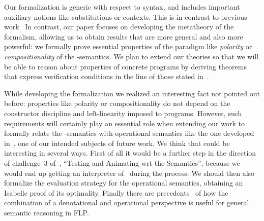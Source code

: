 \documentclass{llncs}
\begin{document}
Our formalization is generic with respect to syntax,
and includes important auxiliary notions like substitutions or
contexts. This is in contrast to previous
work~\cite{ClevaLL04,ClevaPita06}
In contrast, our paper focuses on developing the metatheory of the
formalism, allowing us to obtain results that are more general and
also more powerful: we formally prove essential properties of the
paradigm like \emph{polarity} or \emph{compositionality} of the
\crwl-semantics.
We plan to extend our theories so that we will be able to reason about
properties of concrete programs by deriving theorems that express
verification conditions in the line of those stated
in~\cite{ClevaLL04,ClevaPita06}.




While developing the formalization we realized an interesting fact not
pointed out before: properties like polarity or compositionality do
not depend on the constructor discipline and left-linearity imposed to
programs. However, such requirements will certainly play an essential
role when extending our work to formally relate the \crwl-semantics
with operational semantics like the one developed in~\cite{ppdp2007},
one of our intended subjects of future work. We think that could be
interesting in several ways. First of all it would be a further step
in the direction of challenge~3
of~\cite{DBLP:conf/tphol/AydemirBFFPSVWWZ05}, ``Testing and Animating
wrt the Semantics'', because we would end up getting an interpreter of
\crwl\ during the process. We should then also formalize the
evaluation strategy for the operational semantics, obtaining an
Isabelle proof of its optimality. Finally there are
precedents~\cite{LRSflops08,ppdp2007} of how the combination of a
denotational and operational perspective is useful for general
semantic reasoning in FLP.
\end{document}
